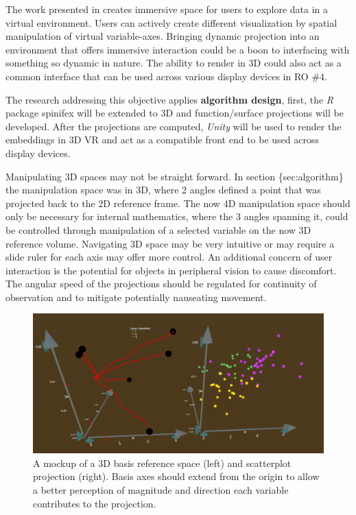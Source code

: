 \documentclass{monashthesis}
\begin{document}
The work presented in \textcite{cordeil_imaxes:_2017} creates immersive
space for users to explore data in a virtual environment. Users can
actively create different visualization by spatial manipulation of
virtual variable-axes. Bringing dynamic projection into an environment
that offers immersive interaction could be a boon to interfacing with
something so dynamic in nature. The ability to render in 3D could also
act as a common interface that can be used across various display
devices in RO \#4.

The research addressing this objective applies \textbf{algorithm
design}, first, the \emph{R} package spinifex will be extended to 3D and
function/surface projections will be developed. After the projections
are computed, \emph{Unity} will be used to render the embeddings in 3D
VR and act as a compatible front end to be used across display devices.

Manipulating 3D spaces may not be straight forward. In section
\{sec:algorithm\} the manipulation space was in 3D, where 2 angles
defined a point that was projected back to the 2D reference frame. The
now 4D manipulation space should only be necessary for internal
mathematics, where the 3 angles spanning it, could be controlled through
manipulation of a selected variable on the now 3D reference volume.
Navigating 3D space may be very intuitive or may require a slide ruler
for each axis may offer more control. An additional concern of user
interaction is the potential for objects in peripheral vision to cause
discomfort. The angular speed of the projections should be regulated for
continuity of observation and to mitigate potentially nauseating
movement.






\begin{figure}

{\centering \includegraphics[width=0.7\linewidth]{./figures/RO3MockUp2} 

}

\caption{A mockup of a 3D basis reference space (left) and
scatterplot projection (right). Basis axes should extend from the origin
to allow a better perception of magnitude and direction each variable
contributes to the projection.}\label{fig:RO3MockUp}
\end{figure}
\end{document}
